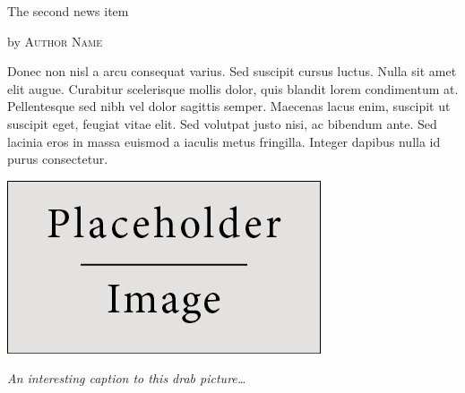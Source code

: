 \documentclass[10pt,a4paper]{article} %
\newcommand{\NewsItem}[1]{ %
    \usefont{T1}{fvs}{n}{n} %
    \vspace{24pt}\large #1\vspace{3pt} %
    \par \normalsize \normalfont}
\newcommand{\NewsAuthor}[1]{ %
    \hfill by \textsc{#1} \vspace{20pt} %
    \par \normalfont}
\begin{document}
\begin{multicols}{3}

    \NewsItem{The second news item}
    \NewsAuthor{Author Name}

    Donec non nisl a arcu consequat varius. Sed suscipit cursus luctus. Nulla sit
    amet elit augue. Curabitur scelerisque mollis dolor, quis blandit lorem
    condimentum at. Pellentesque sed nibh vel dolor sagittis semper. Maecenas lacus
    enim, suscipit ut suscipit eget, feugiat vitae elit. Sed volutpat justo nisi,
    ac bibendum ante. Sed lacinia eros in massa euismod a iaculis metus fringilla.
    Integer dapibus nulla id purus consectetur.

\end{multicols} %

\begin{center}
    \vspace{10pt}
    \includegraphics[width=0.8\linewidth]{placeholder.jpg}
    \par\large\textit{An interesting caption to this drab picture\ldots}
    \vspace{10pt}
\end{center}
\end{document}
